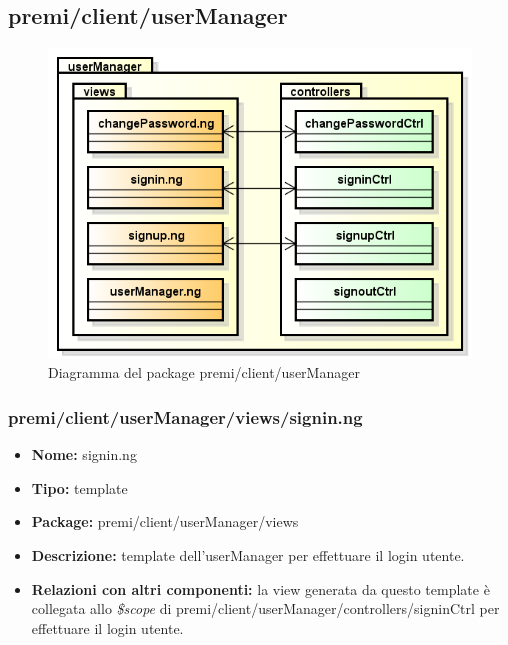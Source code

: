 \subsection{premi/client/userManager}
\begin{figure}[h]
\begin{center}
\includegraphics[scale=0.45]{img/diapkg/userManager.png}
\caption{Diagramma del package premi/client/userManager}
\end{center}
\end{figure}

\subsubsection{premi/client/userManager/views/signin.ng}
\begin{itemize}
  \item[] \textbf{Nome:} signin.ng
  \item[] \textbf{Tipo:} template
  \item[] \textbf{Package:} premi/client/userManager/views
  \item[] \textbf{Descrizione:} template dell'userManager per effettuare il login utente.
  \item[] \textbf{Relazioni con altri componenti:} la view generata da questo template è collegata allo \textit{\$scope} di premi/client/userManager/controllers/signinCtrl per effettuare il login utente.
\end{itemize}

